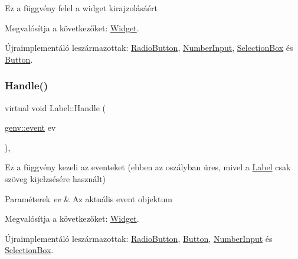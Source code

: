 Ez a függvény felel a widget kirajzolásáért 

Megvalósítja a következőket\+: \hyperlink{class_widget_ac4c2063cd671468ad05d84cfe963c032}{Widget}.



Újraimplementáló leszármazottak\+: \hyperlink{class_radio_button_a296e30588da8a4767164c2dfc5d25a71}{Radio\+Button}, \hyperlink{class_number_input_ab65631421ec222bb929f74d1782b5c8b}{Number\+Input}, \hyperlink{class_selection_box_a1c0b7b6c851180450964a4df0c7c15e8}{Selection\+Box} és \hyperlink{class_button_a6aaa2b781c933a296f41a8eca890eb1f}{Button}.

\mbox{\label{class_label_a5cf04da7def075453b5c0fda93a1b575}} 
\subsubsection{\texorpdfstring{Handle()}{Handle()}}
{\footnotesize\ttfamily virtual void Label\+::\+Handle (\begin{DoxyParamCaption}\item[{\hyperlink{structgenv_1_1event}{genv\+::event}}]{ev }\end{DoxyParamCaption})\hspace{0.3cm}{\ttfamily [inline]}, {\ttfamily [virtual]}}

Ez a függvény kezeli az eventeket (ebben az oszályban üres, mivel a \hyperlink{class_label}{Label} csak szöveg kijelzsésére használt) 
\begin{DoxyParams}{Paraméterek}
{\em ev} & Az aktuális event objektum \\
\hline
\end{DoxyParams}


Megvalósítja a következőket\+: \hyperlink{class_widget_abf512e4606c7a5d44245a9b0246634a0}{Widget}.



Újraimplementáló leszármazottak\+: \hyperlink{class_radio_button_a9287d026f57bdfedd878269ec4648135}{Radio\+Button}, \hyperlink{class_button_a72dc68b7a78edfebe904bf489d6e03fb}{Button}, \hyperlink{class_number_input_a08a2de51093fe35c3c7b9998e88924a9}{Number\+Input} és \hyperlink{class_selection_box_a4762480ce86018d74c0cfa271c9cce11}{Selection\+Box}.

\mbox{\label{class_label_a918ebb45dbaa5484643355cf5ab4be47}} 
